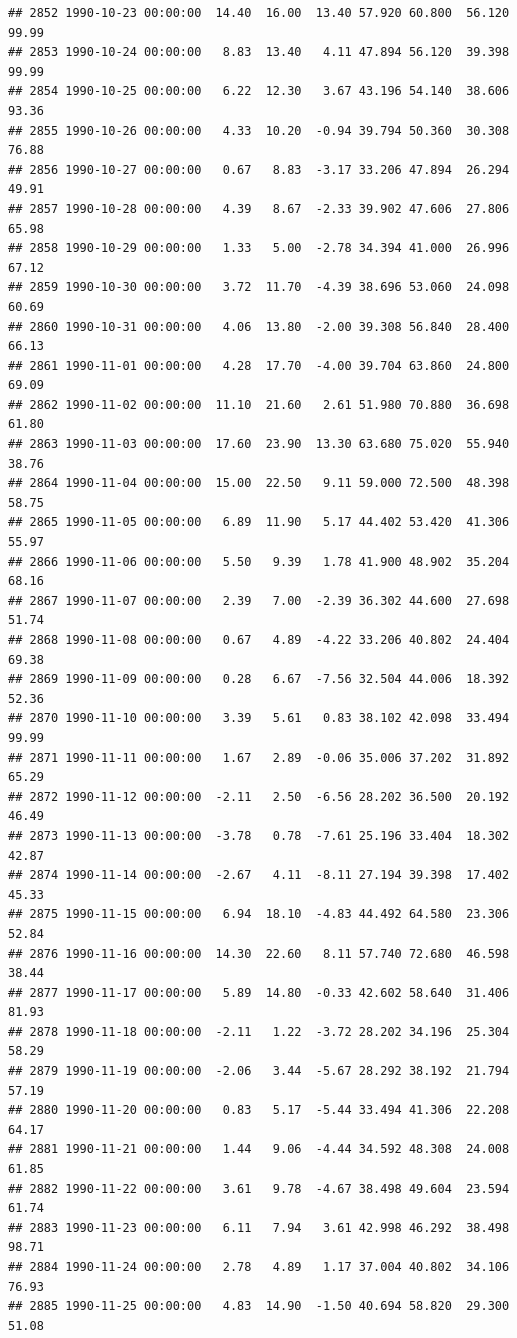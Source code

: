 \documentclass{article}\usepackage{graphicx, color}
\makeatletter
\newenvironment{kframe}{%
 \def\at@end@of@kframe{}%
 \ifinner\ifhmode%
  \def\at@end@of@kframe{\end{minipage}}%
  \begin{minipage}{\columnwidth}%
 \fi\fi%
 \def\FrameCommand##1{\hskip\@totalleftmargin \hskip-\fboxsep
 \colorbox{shadecolor}{##1}\hskip-\fboxsep
     \hskip-\linewidth \hskip-\@totalleftmargin \hskip\columnwidth}%
 \MakeFramed {\advance\hsize-\width
   \@totalleftmargin\z@ \linewidth\hsize
   \@setminipage}}%
 {\par\unskip\endMakeFramed%
 \at@end@of@kframe}
\newenvironment{knitrout}{}{} %
\makeatother
\begin{document}
\begin{knitrout}
\begin{kframe}
\begin{verbatim}
## 2852 1990-10-23 00:00:00  14.40  16.00  13.40 57.920 60.800  56.120  99.99
## 2853 1990-10-24 00:00:00   8.83  13.40   4.11 47.894 56.120  39.398  99.99
## 2854 1990-10-25 00:00:00   6.22  12.30   3.67 43.196 54.140  38.606  93.36
## 2855 1990-10-26 00:00:00   4.33  10.20  -0.94 39.794 50.360  30.308  76.88
## 2856 1990-10-27 00:00:00   0.67   8.83  -3.17 33.206 47.894  26.294  49.91
## 2857 1990-10-28 00:00:00   4.39   8.67  -2.33 39.902 47.606  27.806  65.98
## 2858 1990-10-29 00:00:00   1.33   5.00  -2.78 34.394 41.000  26.996  67.12
## 2859 1990-10-30 00:00:00   3.72  11.70  -4.39 38.696 53.060  24.098  60.69
## 2860 1990-10-31 00:00:00   4.06  13.80  -2.00 39.308 56.840  28.400  66.13
## 2861 1990-11-01 00:00:00   4.28  17.70  -4.00 39.704 63.860  24.800  69.09
## 2862 1990-11-02 00:00:00  11.10  21.60   2.61 51.980 70.880  36.698  61.80
## 2863 1990-11-03 00:00:00  17.60  23.90  13.30 63.680 75.020  55.940  38.76
## 2864 1990-11-04 00:00:00  15.00  22.50   9.11 59.000 72.500  48.398  58.75
## 2865 1990-11-05 00:00:00   6.89  11.90   5.17 44.402 53.420  41.306  55.97
## 2866 1990-11-06 00:00:00   5.50   9.39   1.78 41.900 48.902  35.204  68.16
## 2867 1990-11-07 00:00:00   2.39   7.00  -2.39 36.302 44.600  27.698  51.74
## 2868 1990-11-08 00:00:00   0.67   4.89  -4.22 33.206 40.802  24.404  69.38
## 2869 1990-11-09 00:00:00   0.28   6.67  -7.56 32.504 44.006  18.392  52.36
## 2870 1990-11-10 00:00:00   3.39   5.61   0.83 38.102 42.098  33.494  99.99
## 2871 1990-11-11 00:00:00   1.67   2.89  -0.06 35.006 37.202  31.892  65.29
## 2872 1990-11-12 00:00:00  -2.11   2.50  -6.56 28.202 36.500  20.192  46.49
## 2873 1990-11-13 00:00:00  -3.78   0.78  -7.61 25.196 33.404  18.302  42.87
## 2874 1990-11-14 00:00:00  -2.67   4.11  -8.11 27.194 39.398  17.402  45.33
## 2875 1990-11-15 00:00:00   6.94  18.10  -4.83 44.492 64.580  23.306  52.84
## 2876 1990-11-16 00:00:00  14.30  22.60   8.11 57.740 72.680  46.598  38.44
## 2877 1990-11-17 00:00:00   5.89  14.80  -0.33 42.602 58.640  31.406  81.93
## 2878 1990-11-18 00:00:00  -2.11   1.22  -3.72 28.202 34.196  25.304  58.29
## 2879 1990-11-19 00:00:00  -2.06   3.44  -5.67 28.292 38.192  21.794  57.19
## 2880 1990-11-20 00:00:00   0.83   5.17  -5.44 33.494 41.306  22.208  64.17
## 2881 1990-11-21 00:00:00   1.44   9.06  -4.44 34.592 48.308  24.008  61.85
## 2882 1990-11-22 00:00:00   3.61   9.78  -4.67 38.498 49.604  23.594  61.74
## 2883 1990-11-23 00:00:00   6.11   7.94   3.61 42.998 46.292  38.498  98.71
## 2884 1990-11-24 00:00:00   2.78   4.89   1.17 37.004 40.802  34.106  76.93
## 2885 1990-11-25 00:00:00   4.83  14.90  -1.50 40.694 58.820  29.300  51.08

\end{verbatim}
\end{kframe}
\end{knitrout}
\end{document}
